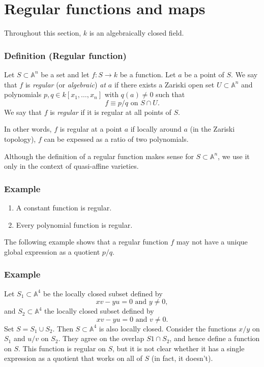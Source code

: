 \documentclass[11pt]{article}
\begin{document}
\section{Regular functions and maps}
\label{sec:org7190273}
Throughout this section, \(k\) is an algebraically closed field.

\subsubsection{Definition (Regular function)}
\label{sec:org1774487}
Let \(S \subset \mathbb A^n\) be a set and let \(f \colon S \to k\) be a function.
Let \(a\) be a point of \(S\).
We say that \(f\) is \emph{regular} (or \emph{algebraic}) \emph{at \(a\)} if there exists a Zariski open set \(U \subset \mathbb A^n\) and polynomials \(p, q \in k[x_1,\dots,x_n]\) with \(q(a) \neq 0\) such that
\[ f \equiv p/q \text{ on } S \cap U.\]
We say that \(f\) is \emph{regular} if it is regular at all points of \(S\).

In other words, \(f\) is regular at a point \(a\) if locally around \(a\) (in the Zariski topology), \(f\) can be expessed as a ratio of two polynomials.

Although the definition of a regular function makes sense for \(S \subset \mathbb A^n\), we use it only in the context of quasi-affine varieties.

\subsubsection{Example}
\label{sec:org99be65b}
\begin{enumerate}
\item A constant function is regular.
\item Every polynomial function is regular.
\end{enumerate}


The following example shows that a regular function \(f\) may not have a unique global expression as a quotient \(p/q\).
\subsubsection{Example}
\label{sec:orgf324e20}
Let \(S_1 \subset \mathbb A^4\) be the locally closed subset defined by
\[ xv - yu = 0 \text{ and } y \neq 0,\]
and \(S_2 \subset \mathbb A^4\) the locally closed subset defined by
\[ xv - yu = 0 \text{ and } v \neq 0.\]
Set \(S = S_1 \cup S_2\). Then \(S \subset \mathbb A^4\) is also locally closed.
Consider the functions \(x/y\) on \(S_1\) and \(u/v\) on \(S_2\).
They agree on the overlap \(S1 \cap S_2\), and hence define a function on \(S\).
This function is regular on \(S\), but it is not clear whether it has a single expression as a quotient that works on all of \(S\) (in fact, it doesn't).
\end{document}
